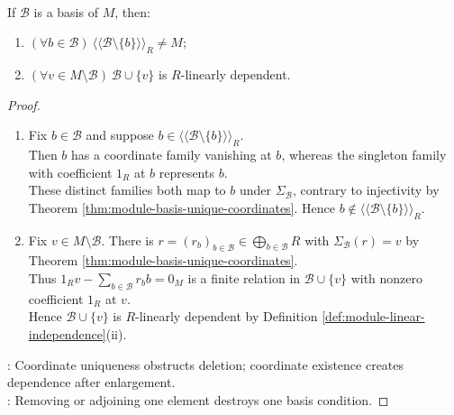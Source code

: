 \begin{proposition} \label{prop:module-basis-minimal-maximal} \\
If $\mathcal{B}$ is a basis of $M$, then:
\begin{enumerate}[label=(\roman*)]
\setlength{\itemsep}{0pt}
\item $(\forall b\in\mathcal{B})\ \langle\!\langle\mathcal{B}\setminus\{b\}\rangle\!\rangle_R\neq M$;
\item $(\forall v\in M\setminus\mathcal{B})\ \mathcal{B}\cup\{v\}$ is $R$-linearly dependent.
\end{enumerate}
\begin{proof}
\begin{enumerate}[label=(\roman*)]
\setlength{\itemsep}{0pt}
\item Fix $b\in\mathcal{B}$ and suppose $b\in\langle\!\langle\mathcal{B}\setminus\{b\}\rangle\!\rangle_R$.\\
Then $b$ has a coordinate family vanishing at $b$, whereas the singleton family with coefficient $1_R$ at $b$ represents $b$.\\
These distinct families both map to $b$ under $\Sigma_{\mathcal{B}}$, contrary to injectivity by Theorem \ref{thm:module-basis-unique-coordinates}. Hence $b\notin\langle\!\langle\mathcal{B}\setminus\{b\}\rangle\!\rangle_R$.
\item Fix $v\in M\setminus\mathcal{B}$. There is $r=(r_b)_{b\in\mathcal{B}}\in\bigoplus\limits_{b\in\mathcal{B}}R$ with $\Sigma_{\mathcal{B}}(r)=v$ by Theorem \ref{thm:module-basis-unique-coordinates}.\\
Thus $1_Rv-\sum\limits_{b\in\mathcal{B}}r_bb=0_M$ is a finite relation in $\mathcal{B}\cup\{v\}$ with nonzero coefficient $1_R$ at $v$.\\
Hence $\mathcal{B}\cup\{v\}$ is $R$-linearly dependent by Definition \ref{def:module-linear-independence}(ii).
\end{enumerate}
: Coordinate uniqueness obstructs deletion; coordinate existence creates dependence after enlargement.\\
: Removing or adjoining one element destroys one basis condition.
\end{proof}
\end{proposition}


